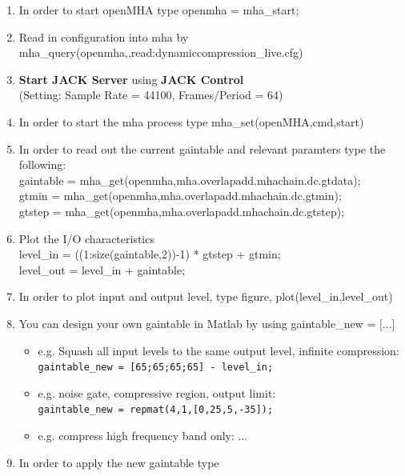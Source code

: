 \documentclass[11pt,a4paper,twoside]{article}
\newcommand{\+}{\discretionary{\mbox{\scriptsize$\hookleftarrow$}}{}{}}
\begin{document}
{{\begin{enumerate}
\item In order to start openMHA type {\ttfamily openmha = mha\_start;} 
\item Read in configuration into mha by \\ {\ttfamily mha\_query(openmha,\textquotesingle{}\textquotesingle{},\textquotesingle{}read:dynamiccompression\_live.cfg\textquotesingle{})}
\item \textbf{Start JACK Server} using \textbf{JACK Control}\\ (Setting: Sample Rate = 44100, Frames/Period = 64)
\item In order to start the mha process type {\ttfamily mha\_set(openMHA,\textquotesingle{}cmd\textquotesingle{},\textquotesingle{}start\textquotesingle{})}
\item In order to read out the current gaintable and relevant paramters type the following: \\
{\ttfamily gaintable = mha\_get(openmha,\textquotesingle{}mha.overlapadd.mhachain.dc.gtdata\textquotesingle{});}\\
{\ttfamily gtmin = mha\_get(openmha,\textquotesingle{}mha.overlapadd.mhachain.dc.gtmin\textquotesingle{});}\\
{\ttfamily gtstep = mha\_get(openmha,\textquotesingle{}mha.overlapadd.mhachain.dc.gtstep\textquotesingle{});}
\item Plot the I/O characteristics \\
{\ttfamily level\_in = ((1:size(gaintable,2))-1) * gtstep + gtmin;}\\
{\ttfamily level\_out = level\_in + gaintable;}
\item In order to plot input and output level, type {\ttfamily figure, plot(level\_in,level\_out)}
\item You can design your own gaintable in Matlab by using 
  {\ttfamily gaintable\_new = [...]}
  \begin{itemize}
  \item e.g. Squash all input levels to the same output level, infinite compression:
    \\ \texttt{gaintable\_new = [65;65;65;65] - level\_in;}
  \item e.g. noise gate, compressive region, output limit: \\
    \texttt{gaintable\_new = repmat(4,1,[0,25,5,-35]);}
  \item e.g. compress high frequency band only: ...
  \end{itemize}
\item In order to apply the new gaintable type \\

\end{enumerate}}}
\end{document}

